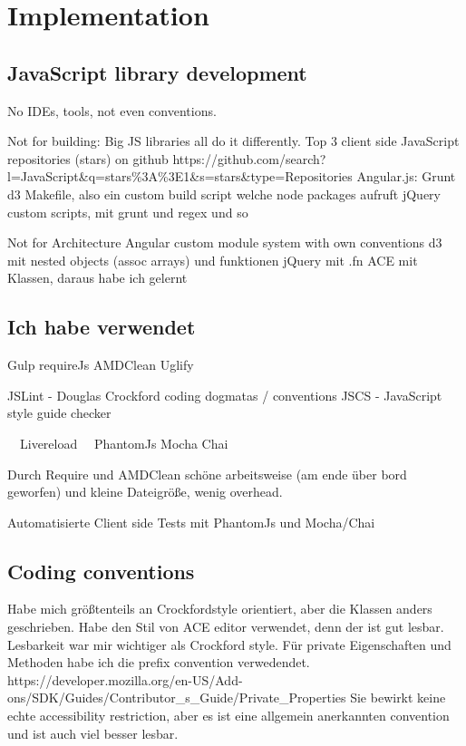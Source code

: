 \chapter{Implementation}

\section{JavaScript library development}

No IDEs, tools, not even conventions.

Not for building:
Big JS libraries all do it differently.
Top 3 client side JavaScript repositories (stars) on github
https://github.com/search?l=JavaScript\&q=stars\%3A\%3E1\&s=stars\&type=Repositories
Angular.js: Grunt
d3 Makefile, also ein custom build script welche node packages aufruft
jQuery custom scripts, mit grunt und regex und so

Not for Architecture
Angular custom module system with own conventions
d3 mit nested objects (assoc arrays) und funktionen
jQuery mit .fn
ACE mit Klassen, daraus habe ich gelernt


\section{Ich habe verwendet}

Gulp
requireJs
AMDClean
Uglify

JSLint - Douglas Crockford coding dogmatas / conventions
JSCS - JavaScript style guide checker

~~Livereload~~
PhantomJs
Mocha
Chai

Durch Require und AMDClean schöne arbeitsweise (am ende über bord geworfen) und kleine Dateigröße, wenig overhead.

Automatisierte Client side Tests mit PhantomJs und Mocha/Chai


\section{Coding conventions}

Habe mich größtenteils an Crockfordstyle orientiert, aber die Klassen anders geschrieben. Habe den Stil von ACE editor verwendet, denn der ist gut lesbar. Lesbarkeit war mir wichtiger als Crockford style. Für private Eigenschaften und Methoden habe ich die prefix convention verwedendet.
https://developer.mozilla.org/en-US/Add-ons/SDK/Guides/Contributor\_s\_Guide/Private\_Properties
Sie bewirkt keine echte accessibility restriction, aber es ist eine allgemein anerkannten convention und ist auch viel besser lesbar.

